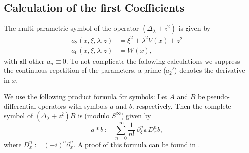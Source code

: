 \subsection{Calculation of the first Coefficients}
The multi-parametric symbol of the operator $(\Delta_\lambda + z^2)$ is given by
\begin{equation}
  \label{eqn:symbol}
  \begin{split}
    a_2(x,\xi,\lambda,z) &= \xi^2 + \lambda^2 V(x) + z^2 \\
    a_0(x,\xi,\lambda,z) &= W(x),
  \end{split}
\end{equation}
with all other $a_n \equiv 0$. To not complicate the following calculations we
suppress the continuous repetition of the parameters, a prime ($a_2'$) denotes
the derivative in $x$.

We use the following product formula for symbols: Let $A$ and $B$ be
pseudo-differential operators with symbols $a$ and $b$, respectively. Then the
complete symbol of $(\Delta_\lambda + z^2)B$ is (modulo $S^\infty$) given by
\begin{equation}
  a * b := \sum_{n=0}^{\infty} \frac{1}{n!}\ \partial_\xi^n a\,D_x^n b,
  \label{eqn:product-formula}
\end{equation}
where $D_x^n := (-i)^n \partial_x^n$. A proof of this formula can be found in
\cite[Thm 3.4]{Shu:POS}.

